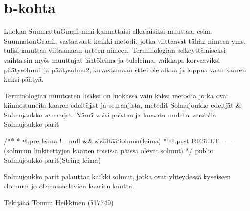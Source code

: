\section{b-kohta}
\label{b-kohta}
Luokan SuunnattuGraafi nimi kannattaisi alkajaisiksi muuttaa, esim. SuunnatonGraafi,
vastaavasti kaikki metodit jotka viittaavat tähän nimeen yms. tulisi muuttaa viitaamaan
uuteen nimeen. Terminologian selkeyttämiseksi vaihtaisin myös muuttujat lähtöleima ja
tuloleima, vaikkapa korvaaviksi päätysolmu1 ja päätysolmu2, kuvastamaan ettei ole alkua
ja loppua vaan kaaren kaksi päätyä.

Terminologian muutosten lisäksi on luokassa vain kaksi metodia jotka ovat kiinnostuneita
kaaren edeltäjist ja seuraajista, metodit Solmujoukko edeltjät & Solmujoukko seuraajat.
Nämä voisi poistaa ja korvata uudella versiolla Solmujoukko parit
\begin{javacode}
/**
* @.pre leima != null && sisältääSolmun(leima)
* @.post RESULT == (solmuun linkitettyjen kaarien toisissa päissä olevat solmut)
*/
public Solmujoukko parit(String leima)
\end{javacode}
Solmujoukko parit palauttaa kaikki solmut, jotka ovat yhteydessä kyseiseen slomuun jo
olemassaolevien kaarien kautta.


Tekijänä Tommi Heikkinen (517749)
